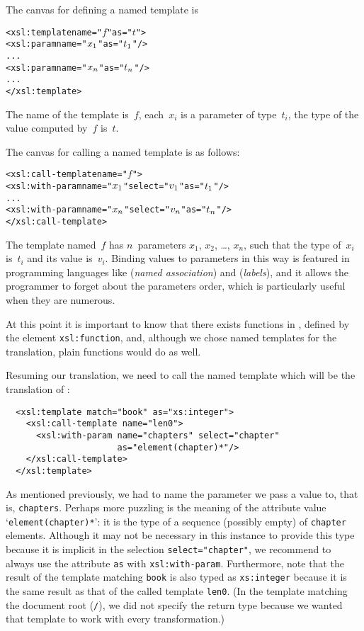 The canvas for defining a named template is
\begin{alltt}
<xsl:template name="\(f\)" as="\(t\)">
  <xsl:param name="\(x\sb{1}\)" as="\(t\sb{1}\)"/>
  ...
  <xsl:param name="\(x\sb{n}\)" as="\(t\sb{n}\)"/>
  ...
</xsl:template>
\end{alltt}
The name of the template is~\(f\), each~\(x_i\) is a parameter of
type~\(t_i\), the type of the value computed by~\(f\) is~\(t\).

The canvas for calling a named template is as follows:
\begin{alltt}
<xsl:call-template name="\(f\)">
  <xsl:with-param name="\(x\sb{1}\)" select="\(v\sb{1}\)" as="\(t\sb{1}\)"/>
  ...
  <xsl:with-param name="\(x\sb{n}\)" select="\(v\sb{n}\)" as="\(t\sb{n}\)"/>
</xsl:call-template>
\end{alltt}
The template named~\(f\) has \(n\)~parameters \(x_1\), \(x_2\),
\ldots, \(x_n\), such that the type of~\(x_i\) is~\(t_i\) and its
value is~\(v_i\). Binding values to parameters in this way is featured
in programming languages like \Ada (\emph{named association}) and
\OCaml (\emph{labels}), and it allows the programmer to forget about
the parameters order, which is particularly useful when they are
numerous.

At this point it is important to know that there exists functions in
\XSLT, defined by the element \texttt{xsl:function}, and, although we
chose named templates for the translation, plain \XSLT functions would
do as well.

Resuming our translation, we need to call the named template which
will be the translation of :
\begin{verbatim}
  <xsl:template match="book" as="xs:integer">
    <xsl:call-template name="len0">
      <xsl:with-param name="chapters" select="chapter"
                      as="element(chapter)*"/>
    </xsl:call-template>
  </xsl:template>
\end{verbatim}
As mentioned previously, we had to name the parameter we pass a value
to, that is, \texttt{chapters}. Perhaps more puzzling is the meaning
of the attribute value `\texttt{element(chapter)*}': it is the type of
a sequence (possibly empty) of \texttt{chapter} elements. Although it
may not be necessary in this instance to provide this type because it
is implicit in the selection \texttt{select="chapter"}, we recommend
to always use the attribute \texttt{as} with
\texttt{xsl:with-param}. Furthermore, note that the result of the
template matching \texttt{book} is also typed as \texttt{xs:integer}
because it is the same result as that of the called template
\texttt{len0}. (In the template matching the document root
(\texttt{/}), we did not specify the return type because we wanted
that template to work with every transformation.)

